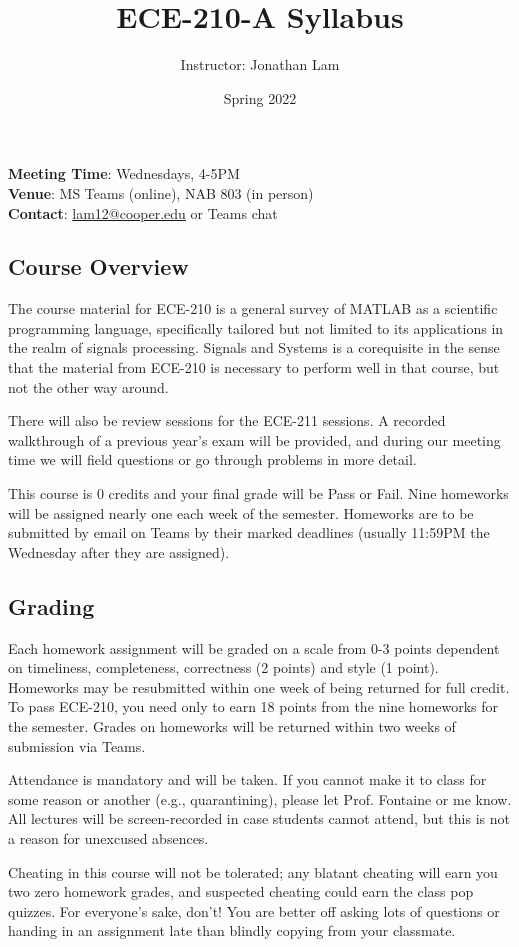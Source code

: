 \documentclass{article}
\title{ECE-210-A Syllabus}
\author{Instructor: Jonathan Lam}
\date{Spring 2022}
\begin{document}
\maketitle
\noindent\textbf{Meeting Time}: Wednesdays, 4-5PM \\
\textbf{Venue}: MS Teams (online), NAB 803 (in person) \\
\textbf{Contact}: \href{mailto:lam12@cooper.edu}{lam12@cooper.edu} or Teams chat

\subsection*{Course Overview}
The course material for ECE-210 is a general survey of MATLAB as a scientific programming language, specifically tailored but not limited to its applications in the realm of signals processing. Signals and Systems is a corequisite in the sense that the material from ECE-210 is necessary to perform well in that course, but not the other way around.

There will also be review sessions for the ECE-211 sessions. A recorded walkthrough of a previous year's exam will be provided, and during our meeting time we will field questions or go through problems in more detail.

This course is 0 credits and your final grade will be Pass or Fail. Nine homeworks will be assigned nearly one each week of the semester. Homeworks are to be submitted by email on Teams by their marked deadlines (usually 11:59PM the Wednesday after they are assigned).

\subsection*{Grading}
Each homework assignment will be graded on a scale from 0-3 points dependent on timeliness, completeness, correctness (2 points) and style (1 point). Homeworks may be resubmitted within one week of being returned for full credit. To pass ECE-210, you need only to earn 18 points from the nine homeworks for the semester. Grades on homeworks will be returned within two weeks of submission via Teams.

Attendance is mandatory and will be taken. If you cannot make it to class for some reason or another (e.g., quarantining), please let Prof. Fontaine or me know. All lectures will be screen-recorded in case students cannot attend, but this is not a reason for unexcused absences.

Cheating in this course will not be tolerated; any blatant cheating will earn you two zero homework grades, and suspected cheating could earn the class pop quizzes. For everyone's sake, don't! You are better off asking lots of questions or handing in an assignment late than blindly copying from your classmate.
\end{document}
